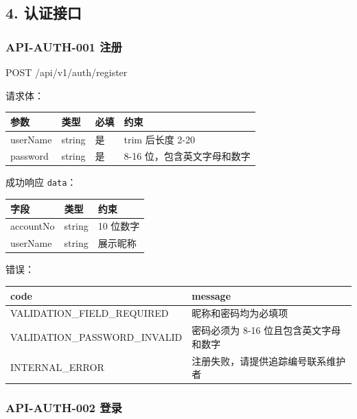 \documentclass[
  a4paper,
  UTF8]{ctexart}
\newenvironment{Shaded}{}{}
\newcommand{\NormalTok}[1]{#1}
\begin{document}
\hypertarget{ux8ba4ux8bc1ux63a5ux53e3}{%
\subsection{4. 认证接口}\label{ux8ba4ux8bc1ux63a5ux53e3}}

\hypertarget{api-auth-001-ux6ce8ux518c}{%
\subsubsection{API-AUTH-001 注册}\label{api-auth-001-ux6ce8ux518c}}

\begin{Shaded}
\begin{Highlighting}[]
\NormalTok{POST /api/v1/auth/register}
\end{Highlighting}
\end{Shaded}

请求体：

\begin{longtable}[]{@{}llll@{}}
\toprule
参数 & 类型 & 必填 & 约束 \\
\midrule
\endhead
userName & string & 是 & trim 后长度 2-20 \\
password & string & 是 & 8-16 位，包含英文字母和数字 \\
\bottomrule
\end{longtable}

成功响应 \texttt{data}：

\begin{longtable}[]{@{}lll@{}}
\toprule
字段 & 类型 & 约束 \\
\midrule
\endhead
accountNo & string & 10 位数字 \\
userName & string & 展示昵称 \\
\bottomrule
\end{longtable}

错误：

\begin{longtable}[]{@{}ll@{}}
\toprule
code & message \\
\midrule
\endhead
VALIDATION\_FIELD\_REQUIRED & 昵称和密码均为必填项 \\
VALIDATION\_PASSWORD\_INVALID & 密码必须为 8-16
位且包含英文字母和数字 \\
INTERNAL\_ERROR & 注册失败，请提供追踪编号联系维护者 \\
\bottomrule
\end{longtable}

\hypertarget{api-auth-002-ux767bux5f55}{%
\subsubsection{API-AUTH-002 登录}\label{api-auth-002-ux767bux5f55}}
\end{document}
